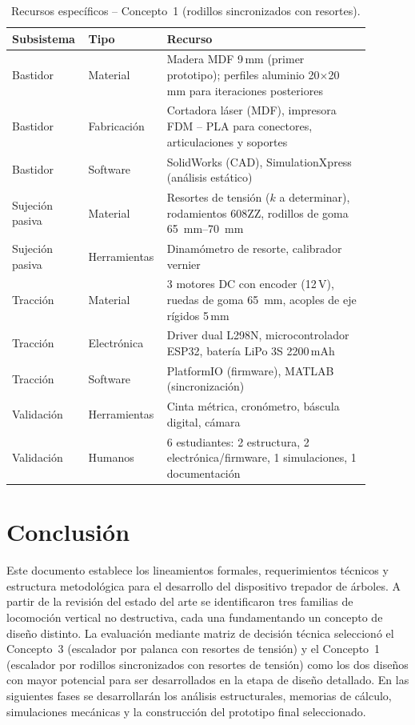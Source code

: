 \documentclass[lettersize,journal]{IEEEtran}
\begin{document}
\begin{table}[H]
\centering
\caption{Recursos específicos -- Concepto~1 (rodillos sincronizados con resortes).}
\label{tab:recursos_c1}
\scriptsize
\setlength{\tabcolsep}{3pt}
\begin{tabular}{p{0.18\linewidth} p{0.16\linewidth} p{0.55\linewidth}}
\toprule
\textbf{Subsistema} & \textbf{Tipo} & \textbf{Recurso} \\
\midrule
Bastidor
    & Material
    & Madera MDF 9\,mm (primer prototipo); perfiles aluminio
      20$\times$20\,mm para iteraciones posteriores \\
Bastidor
    & Fabricación
    & Cortadora láser (MDF), impresora FDM -- PLA para
      conectores, articulaciones y soportes \\
Bastidor
    & Software
    & SolidWorks (CAD), SimulationXpress (análisis estático) \\
\midrule
Sujeción pasiva
    & Material
    & Resortes de tensión ($k$ a determinar),
      rodamientos 608ZZ,
      rodillos de goma \SI{65}{\milli\meter}--\SI{70}{\milli\meter} \\
Sujeción pasiva
    & Herramientas
    & Dinamómetro de resorte, calibrador vernier \\
\midrule
Tracción
    & Material
    & 3 motores DC con encoder (12\,V),
      ruedas de goma \SI{65}{\milli\meter},
      acoples de eje rígidos 5\,mm \\
Tracción
    & Electrónica
    & Driver dual L298N, microcontrolador ESP32,
      batería LiPo 3S 2200\,mAh \\
Tracción
    & Software
    & PlatformIO (firmware), MATLAB (sincronización) \\
\midrule
Validación
    & Herramientas
    & Cinta métrica, cronómetro, báscula digital, cámara \\
Validación
    & Humanos
    & 6 estudiantes: 2 estructura, 2 electrónica/firmware,
      1 simulaciones, 1 documentación \\
\bottomrule
\end{tabular}
\end{table}

\section{\textbf{Conclusión}}

Este documento establece los lineamientos formales, requerimientos técnicos y estructura
metodológica para el desarrollo del dispositivo trepador de árboles. A partir de la
revisión del estado del arte se identificaron tres familias de locomoción vertical no
destructiva, cada una fundamentando un concepto de diseño distinto. La evaluación
mediante matriz de decisión técnica seleccionó el Concepto~3 (escalador por palanca con
resortes de tensión) y el Concepto~1 (escalador por rodillos sincronizados con resortes
de tensión) como los dos diseños con mayor potencial para ser desarrollados en la etapa
de diseño detallado. En las siguientes fases se desarrollarán los análisis
estructurales, memorias de cálculo, simulaciones mecánicas y la construcción del
prototipo final seleccionado.




\end{document}
